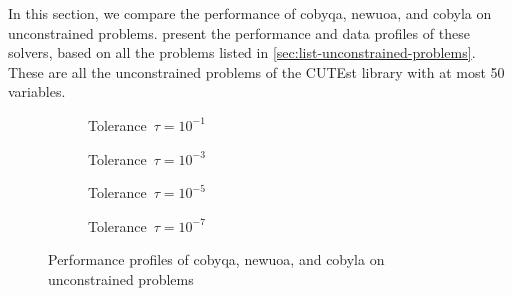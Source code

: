 In this section, we compare the performance of \gls{cobyqa}, \gls{newuoa}, and \gls{cobyla} on unconstrained problems.
 present the performance and data profiles of these solvers, based on all the problems listed in \cref{sec:list-unconstrained-problems}.
These are all the unconstrained problems of the CUTEst library with at most \num{50} variables.

\begin{figure}[ht]
    \centering
    \begin{subfigure}[b]{0.49\textwidth}
        \centering
        \caption{Tolerance~$\tau = 10^{-1}$}
    \end{subfigure}
    \hfill
    \begin{subfigure}[b]{0.49\textwidth}
        \centering
        \caption{Tolerance~$\tau = 10^{-3}$}
    \end{subfigure}
    \begin{subfigure}[b]{0.49\textwidth}
        \centering
        \caption{Tolerance~$\tau = 10^{-5}$}
    \end{subfigure}
    \hfill
    \begin{subfigure}[b]{0.49\textwidth}
        \centering
        \caption{Tolerance~$\tau = 10^{-7}$}
    \end{subfigure}
    \caption[Performance profiles on unconstrained problems]{Performance profiles of \gls{cobyqa}, \gls{newuoa}, and \gls{cobyla} on unconstrained problems}
    \label{fig:perf-unconstrained-problems}
\end{figure}

